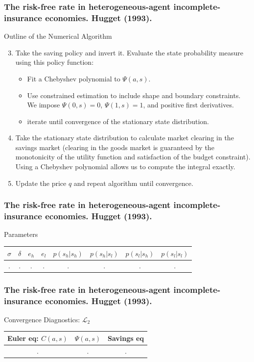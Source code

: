 \documentclass{beamer}
\begin{document}
\frame
{
  \frametitle{  The risk-free rate in heterogeneous-agent incomplete-insurance economies. Hugget (1993).}
Outline of the Numerical Algorithm 
  \begin{enumerate}
    \setcounter{enumi}{2}
	\item Take the saving policy and invert it. Evaluate the state probability measure using this policy function:
	\begin{itemize}
		\item Fit a Chebyshev polynomial to $\Psi(a,s)$. 
		\item Use constrained estimation to include shape and boundary constraints. We impose $\Psi(0,s)=0$, $	
		\Psi(1,s)=1$, and positive first derivatives.  
		\item iterate until convergence of the stationary state distribution.
	\end{itemize}
	
	\item Take the stationary state distribution to calculate market clearing in the savings market (clearing in the goods market 	is guaranteed by the monotonicity of the utility function and satisfaction of the budget constraint). Using a Chebyshev 	
	polynomial allows us to compute the integral exactly.

	\item Update the price $q$ and repeat algorithm until convergence. 
	
\end{enumerate}
}

\frame
{
  \frametitle{ The risk-free rate in heterogeneous-agent incomplete-insurance economies. Hugget (1993).}
Parameters
\begin{table}[htbp] {
\vspace{1mm}
\begin{tabular}{ | c | c | c | c | c | c | c | c |} 
\hline

 $\sigma$ & $\delta$ & $e_h$ & $e_l$ &$p(s_h \vert s_h)$&$p(s_h \vert s_l)$&$p(s_l \vert s_h)$&$p(s_l \vert s_l)$\\ 
\hline			
			.&.&.&.&.&.&.&. \\
\hline
\end{tabular}}
\end{table}
}


\frame
{
  \frametitle{ The risk-free rate in heterogeneous-agent incomplete-insurance economies. Hugget (1993).}
Convergence Diagnostics: $\mathcal{L}_2$

\begin{table}[htbp] {
\vspace{1mm}
\begin{tabular}{ | c | c | c | } 
\hline

 Euler eq: $C(a,s)$ & $\Psi(a,s)$ & Savings  eq \\ 
\hline			
			.&.&.\\
\hline
\end{tabular}}
\end{table}
}
\end{document}
